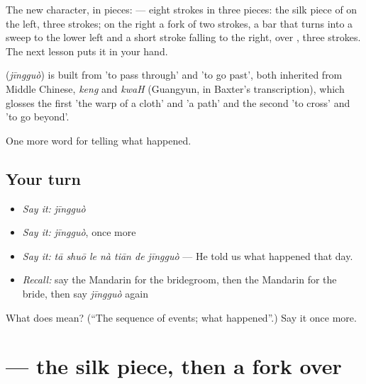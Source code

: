 The new character, in pieces:  — eight strokes in three pieces: the silk piece of  on the left, three strokes; on the right a fork of two strokes, a bar that turns into a sweep to the lower left and a short stroke falling to the right, over , three strokes. The next lesson puts it in your hand.

\begin{cousinweb}
\textbf{} (\emph{jīngguò}) is built from  'to pass through' and  'to go past', both inherited from Middle Chinese, \emph{keng} and \emph{kwaH} (Guangyun, in Baxter's transcription), which glosses the first 'the warp of a cloth' and 'a path' and the second 'to cross' and 'to go beyond'.
\end{cousinweb}

\begin{grammarlens}[title={What you've built}]
One more word for telling what happened.
\end{grammarlens}

\subsection*{Your turn}
\begin{itemize}
\raggedright
  \item \emph{Say it:} \emph{jīngguò}
  \item \emph{Say it:} \emph{jīngguò}, once more
  \item \emph{Say it:} \emph{tā shuō le nà tiān de jīngguò} — He told us what happened that day.
  \item \emph{Recall:} say the Mandarin for the bridegroom, then the Mandarin for the bride, then say \emph{jīngguò} again
\end{itemize}

\begin{tcolorbox}[breakable,colback=teal!4,colframe=teal!35!black,title={Before you move on}]
What does  mean? (\textquotedblleft{}The sequence of events; what happened\textquotedblright{}.) Say it once more.
\end{tcolorbox}
\section[\texorpdfstring{\zh{经} (jīng)}{经 (jīng)}]{ — the silk piece, then a fork over }

\label{lesson:ZH-W306-jing-pass}




